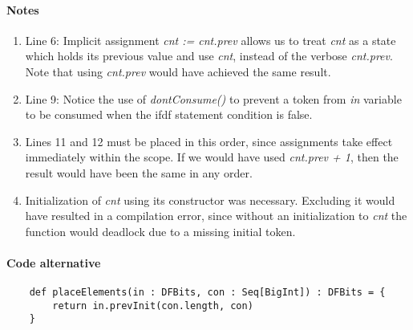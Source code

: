\paragraph{Notes}
\begin{enumerate}
	\item Line 6: Implicit assignment \textit{cnt := cnt.prev} allows us to treat \textit{cnt} as a state which holds its previous value and use \textit{cnt}, instead of the verbose \textit{cnt.prev}. Note that using \textit{cnt.prev} would have achieved the same result.
	\item Line 9: Notice the use of \textit{dontConsume()} to prevent a token from \textit{in} variable to be consumed when the ifdf statement condition is false.
	\item Lines 11 and 12 must be placed in this order, since assignments take effect immediately within the scope. If we would have used \textit{cnt.prev + 1}, then the result would have been the same in any order.
	\item Initialization of \textit{cnt} using its constructor was necessary. Excluding it would have resulted in a compilation error, since without an initialization to \textit{cnt} the function would deadlock due to a missing initial token.
\end{enumerate}
\paragraph{Code alternative}
\begin{verbatim}
	def placeElements(in : DFBits, con : Seq[BigInt]) : DFBits = {
		return in.prevInit(con.length, con)
	}
\end{verbatim}

\vfill
\pagebreak


